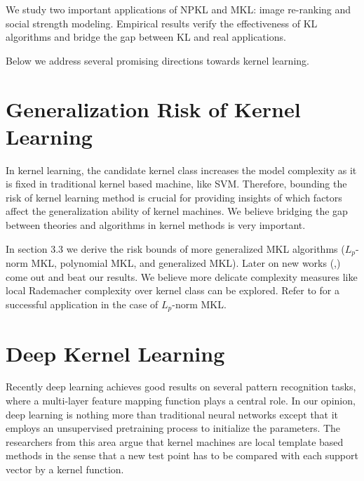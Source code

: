 We study two important applications of NPKL and MKL: image re-ranking and social strength modeling. Empirical results verify the effectiveness of KL algorithms and bridge the gap between KL and real applications.

Below we address several promising directions towards kernel learning.

\section{Generalization Risk of Kernel Learning}

In kernel learning, the candidate kernel class increases the model complexity as it is fixed in traditional kernel based machine, like SVM. Therefore, bounding the risk of kernel learning method is crucial for providing insights of which factors affect the generalization ability of kernel machines. We believe bridging the gap between theories and algorithms in kernel methods is very important.

In section 3.3 we derive the risk bounds of more generalized MKL algorithms ($L_p$-norm MKL\cite{nips/KloftBSLMZ09}, polynomial MKL\cite{nips/CortesMR09}, and generalized MKL\cite{icml/VarmaB09}). Later on new works (\cite{icml/CortesMR10a},\cite{corr/HussainS11}) come out and beat our results. We believe more delicate complexity measures like local Rademacher complexity over kernel class can be explored. Refer to \cite{arxiv/KloftB11} for a successful application in the case of $L_p$-norm MKL.

\section{Deep Kernel Learning}

Recently deep learning achieves good results on several pattern recognition tasks, where a multi-layer feature mapping function plays a central role. In our opinion, deep learning is nothing more than traditional neural networks except that it employs an unsupervised pretraining process to initialize the parameters. The researchers from this area argue that kernel machines are local template based methods in the sense that a new test point has to be compared with each support vector by a kernel function.

